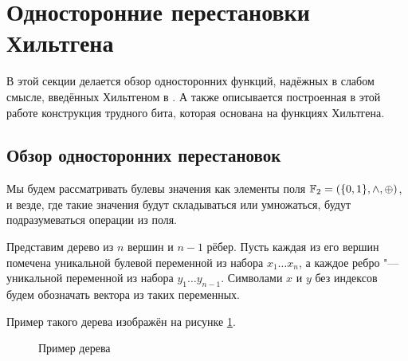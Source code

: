 \documentclass[a4paper, 14pt]{extarticle}
\begin{document}
\section{Односторонние перестановки Хильтгена}
\label{sec_hiltgen}

В этой секции делается обзор односторонних функций, надёжных в слабом смысле,
введённых Хильтгеном в \cite{hiltgen1993}. А также описывается построенная в
этой работе конструкция трудного бита, которая основана на функциях Хильтгена.

\subsection{Обзор односторонних перестановок}

Мы будем рассматривать булевы значения как элементы поля ${\mathbb F}_2 = (\{0, 1\}, \land,
\oplus)$, и везде, где такие значения будут складываться или умножаться, будут
подразумеваться операции из поля.

Представим дерево из $n$ вершин и $n - 1$ рёбер. Пусть каждая из его вершин
помечена уникальной булевой переменной из набора $x_1 \dots x_n$, а каждое ребро
"--- уникальной переменной из набора $y_1 \dots y_{n-1}$. Символами $x$ и $y$ без
индексов будем обозначать вектора из таких переменных.

Пример такого дерева изображён на рисунке \ref{fig_tree}.

\begin{figure}[h]
\centering
{}
\caption{Пример дерева}
\label{fig_tree}
\end{figure}
\end{document}
